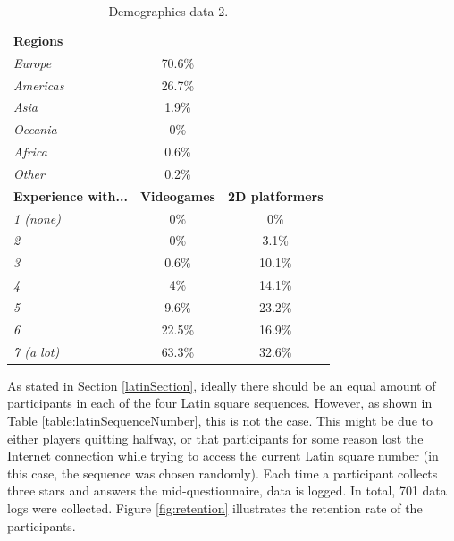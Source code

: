 \begin{table} \centering
\small
\caption{Demographics data 2.}
\label{table:demographics2}
\begin{tabular}{lcc}
\toprule
\textbf{Regions}                      &                & \textbf{}               \\ 
\textit{Europe}                      & 70.6\%         &                         \\
\textit{Americas}                    & 26.7\%         &                         \\
\textit{Asia}                        & 1.9\%          &                         \\
\textit{Oceania}                     & 0\%            &                         \\
\textit{Africa}                      & 0.6\%          &                         \\
\textit{Other}                       & 0.2\%          &                         \\
\textbf{Experience with...} & \textbf{Videogames} & \textbf{2D platformers} \\
\textit{1 (none)}                           & 0\%            & 0\%                     \\
\textit{2}                           & 0\%            & 3.1\%                   \\ 
\textit{3}                           & 0.6\%          & 10.1\%                  \\
\textit{4}                           & 4\%            & 14.1\%                  \\ 
\textit{5}                           & 9.6\%          & 23.2\%                  \\ 
\textit{6}                           & 22.5\%         & 16.9\%                  \\
\textit{7 (a lot)}                           & 63.3\%         & 32.6\%                  \\
\bottomrule
\end{tabular}
\end{table}

As stated in Section \ref{latinSection}, ideally there should be an equal amount of participants in each of the four Latin square sequences. However, as shown in Table \ref{table:latinSequenceNumber}, this is not the case. This might be due to either players quitting halfway, or that participants for some reason lost the Internet connection while trying to access the current Latin square number (in this case, the sequence was chosen randomly). Each time a participant collects three stars and answers the mid-questionnaire, data is logged. In total, 701 data logs were collected. Figure \ref{fig:retention} illustrates the retention rate of the participants.

